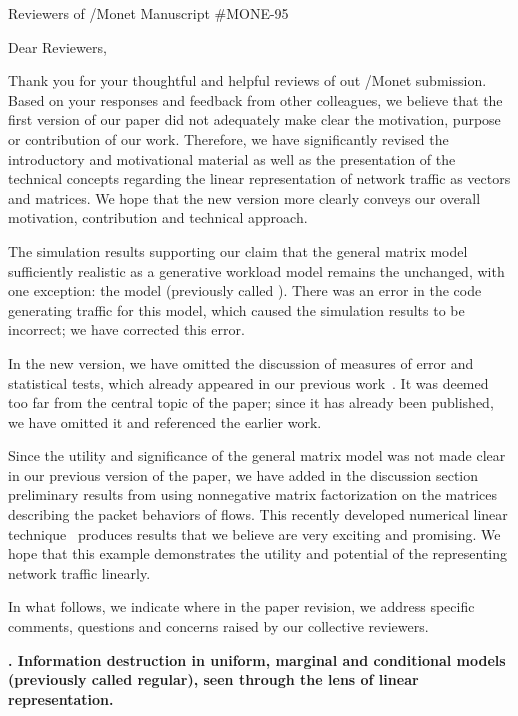 \documentclass{letter}
\newcounter{topic}
\newcommand{\topic}[1]{
\addtocounter{topic}{1}
\textbf{\arabic{topic}. #1}
}
\begin{document}
\begin{letter}{Reviewers of /Monet Manuscript \#MONE-95}

\opening{Dear Reviewers,}

Thank you for your thoughtful and helpful reviews of out /Monet submission.
Based on your responses and feedback from other colleagues, we believe that the first version of our paper did not adequately make clear the motivation, purpose or contribution of our work.
Therefore, we have significantly revised the introductory and motivational material as well as the presentation of the technical concepts regarding the linear representation of network traffic as vectors and matrices.
We hope that the new version more clearly conveys our overall motivation, contribution and technical approach.

The simulation results supporting our claim that the general matrix model sufficiently realistic as a generative workload model remains the unchanged, with one exception:
the  model (previously called ).
There was an error in the code generating traffic for this model, which caused the simulation results to be incorrect;
we have corrected this error.

In the new version, we have omitted the discussion of measures of error and statistical tests, which already appeared in our previous work~\cite{Karpinski07:cbr-failure}. It was deemed too far from the central topic of the paper; since it has already been published, we have omitted it and referenced the earlier work.

Since the utility and significance of the general matrix model was not made clear in our previous version of the paper, we have added in the discussion section preliminary results from using nonnegative matrix factorization on the  matrices describing the packet behaviors of flows. This recently developed numerical linear technique~\cite{Lee01} produces results that we believe are very exciting and promising.
We hope that this example demonstrates the utility and potential of the representing network traffic linearly.

In what follows, we indicate where in the paper revision, we address specific comments, questions and concerns raised by our collective reviewers.

\topic{Information destruction in uniform, marginal and conditional models (previously called regular), seen through the lens of linear representation.}


\end{letter}
\end{document}
